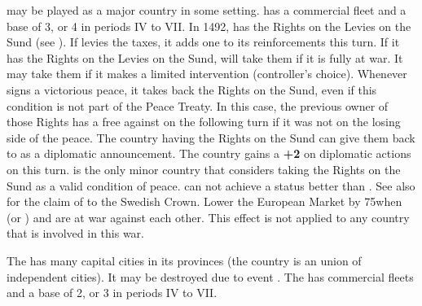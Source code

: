\label{chSpecific:Denmark}
\aparag {} may be played as a major country in
some setting.
\aparag {} has a commercial fleet and a base \FTI of 3, or
4 in periods IV to VII.
\bparag In 1492,  has the Rights on the Levies on the
Sund (see ).
\bparag If  levies the taxes, it adds one \LD to its
reinforcements this turn. If it has the Rights on the Levies on the
Sund,  will take them if it is fully at war.  It may take
them if it makes a limited intervention (controller's choice).
\bparag Whenever  signs a victorious peace, it takes back
the Rights on the Sund, even if this condition is not part of the Peace
Treaty. In this case, the previous owner of those Rights has a free \CB
against  on the following turn if it was not on the
losing side of the peace.
\bparag The country having the Rights on the Sund can give them back to
 as a diplomatic announcement. The country gains a {\bf
  +2} on diplomatic actions on  this turn.
\bparag {} is the only minor country that considers taking
the Rights on the Sund as a valid condition of peace.
\bparag \SUE can not achieve a status better than \MA. See also
 for the claim of  to the
Swedish Crown.
\bparag Lower the European Market by 75\ducats when \SUE (or
) and  are at war against each other. This
effect is not applied to any country that is involved in this war.

\label{chSpecific:Hansa}
\aparag The  has many capital cities in its provinces (the
country is an union of independent cities). It may be destroyed due to
event .
\aparag The  has commercial fleets and a base \FTI of 2, or
3 in periods IV to VII.

